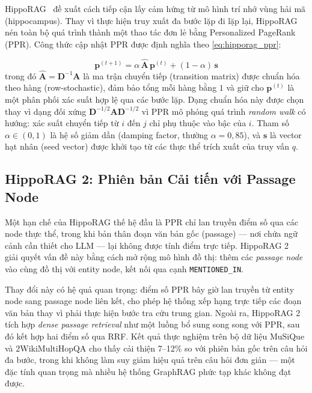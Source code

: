 \documentclass[12pt,a4paper]{report}
\theoremstyle{plain}
\theoremstyle{definition}
\begin{document}
	HippoRAG~\cite{gutierrez2024hipporag} đề xuất cách tiếp cận lấy cảm hứng từ
	mô hình trí nhớ vùng hải mã (hippocampus). Thay vì thực hiện truy xuất đa bước
	lặp đi lặp lại, HippoRAG nén toàn bộ quá trình thành một thao tác đơn lẻ bằng
	Personalized PageRank (PPR). Công thức cập nhật PPR được định nghĩa theo
	\eqref{eq:hipporag_ppr}:
	
	\begin{equation}
		\mathbf{p}^{(t+1)}
		= \alpha\,\hat{\mathbf{A}}\,\mathbf{p}^{(t)}
		+ (1-\alpha)\,\mathbf{s}
		\label{eq:hipporag_ppr}
	\end{equation}
	trong đó $\hat{\mathbf{A}} = \mathbf{D}^{-1}\mathbf{A}$ là ma trận chuyển tiếp
	(transition matrix) được chuẩn hóa theo hàng (row-stochastic), đảm bảo tổng mỗi
	hàng bằng $1$ và giữ cho $\mathbf{p}^{(t)}$ là một phân phối xác suất hợp lệ
	qua các bước lặp. Dạng chuẩn hóa này được chọn thay vì dạng đối xứng
	$\mathbf{D}^{-1/2}\mathbf{A}\mathbf{D}^{-1/2}$ vì PPR mô phỏng quá trình
	\emph{random walk} có hướng: xác suất chuyển tiếp từ $i$ đến $j$ chỉ phụ
	thuộc vào bậc của $i$. Tham số $\alpha \in (0,1)$ là hệ số giảm dần
	(damping factor, thường $\alpha = 0{,}85$), và $\mathbf{s}$ là vector hạt
	nhân (seed vector) được khởi tạo từ các thực thể trích xuất của truy vấn $q$.
	
	\subsection{HippoRAG 2: Phiên bản Cải tiến với Passage Node}
	\label{subsec:hipporag2}

	Một hạn chế của HippoRAG thế hệ đầu là PPR chỉ lan truyền điểm số qua các
	node thực thể, trong khi bản thân đoạn văn bản gốc (passage) --- nơi chứa
	ngữ cảnh cần thiết cho LLM --- lại không được tính điểm trực tiếp. HippoRAG
	2~\cite{gutierrez2024hipporag} giải quyết vấn đề này bằng cách mở rộng mô
	hình đồ thị: thêm các \emph{passage node} vào cùng đồ thị với entity node,
	kết nối qua cạnh \texttt{MENTIONED\_IN}.

	Thay đổi này có hệ quả quan trọng: điểm số PPR bây giờ lan truyền từ entity
	node sang passage node liên kết, cho phép hệ thống xếp hạng trực tiếp các
	đoạn văn bản thay vì phải thực hiện bước tra cứu trung gian. Ngoài ra,
	HippoRAG 2 tích hợp \emph{dense passage retrieval} như một luồng bổ sung
	song song với PPR, sau đó kết hợp hai điểm số qua RRF. Kết quả thực nghiệm
	trên bộ dữ liệu MuSiQue và 2WikiMultiHopQA cho thấy cải thiện 7--12\% so với
	phiên bản gốc trên câu hỏi đa bước, trong khi không làm suy giảm hiệu quả
	trên câu hỏi đơn giản --- một đặc tính quan trọng mà nhiều hệ thống GraphRAG
	phức tạp khác không đạt được.
\end{document}
